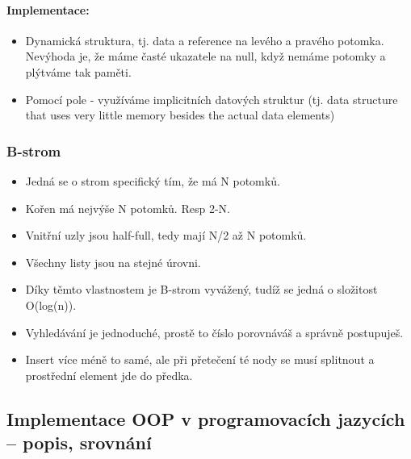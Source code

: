 \documentclass[10pt,a4paper]{article}
\begin{document}
\paragraph{Implementace:}

\begin{itemize}
\item Dynamická struktura, tj. data a reference na levého a pravého potomka. Nevýhoda je, že máme časté ukazatele na null, když nemáme potomky a plýtváme tak paměti.
\item Pomocí pole - využíváme implicitních datových struktur (tj. data structure that uses very little memory besides the actual data elements) 
\end{itemize}
\subsubsection{B-strom}
\begin{itemize}
\item Jedná se o strom specifický tím, že má N potomků.
\item Kořen má nejvýše N potomků. Resp 2-N.
\item Vnitřní uzly jsou half-full, tedy mají N/2 až N potomků.
\item Všechny listy jsou na stejné úrovni.
\item Díky těmto vlastnostem je B-strom vyvážený, tudíž se jedná o složitost O(log(n)).
\item Vyhledávání je jednoduché, prostě to číslo porovnáváš a správně postupuješ.
\item Insert více méně to samé, ale při přetečení té nody se musí splitnout a prostřední element jde do předka.
\end{itemize}

\subsection{Implementace OOP v programovacích jazycích – popis, srovnání}
\end{document}
